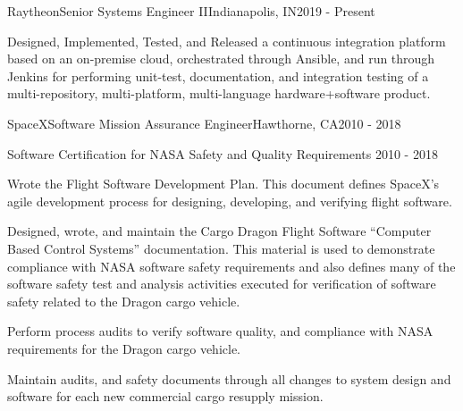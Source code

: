 



\begin{cventries}


  \cventry
  {Raytheon}{Senior Systems Engineer II}{Indianapolis, IN}{2019 - Present}
  {
    \begin{cvitems}
    \item Designed, Implemented, Tested, and Released a continuous integration platform based on an
      on-premise cloud, orchestrated through Ansible, and run through Jenkins for performing
      unit-test, documentation, and integration testing of a multi-repository, multi-platform,
      multi-language hardware+software product.
    \end{cvitems}
  }

  \cventry
  {SpaceX}{Software Mission Assurance Engineer}{Hawthorne, CA}{2010 - 2018}
  {}

  \cventry
  {Software Certification for NASA Safety and Quality Requirements}
  {}{}{2010 - 2018}
  {
    \begin{cvitems}
    \item Wrote the Flight Software Development Plan. This document defines
      SpaceX's agile development process for designing, developing, and
      verifying flight software.
    \item Designed, wrote, and maintain the Cargo Dragon Flight Software
      ``Computer Based Control Systems'' documentation. This material is
      used to demonstrate compliance with NASA software safety
      requirements and also defines many of the software safety test and
      analysis activities executed for verification of software safety
      related to the Dragon cargo vehicle.
    \item Perform process audits to verify software quality, and
      compliance with NASA requirements for the Dragon cargo vehicle.
    \item Maintain audits, and safety documents through all changes to
      system design and software for each new commercial cargo resupply
      mission.
    \end{cvitems}
  }


\end{cventries}
